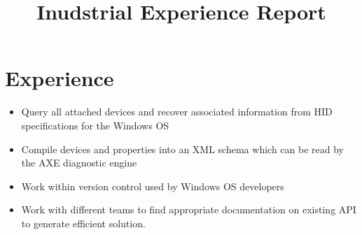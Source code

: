 \documentclass{moderncv}
\title{Inudstrial Experience Report}
\begin{document}
\section{Experience}
\begin{itemize}
 \item Query all attached devices and recover associated information from HID specifications for the Windows OS
 \item Compile devices and properties into an XML schema which can be read by the AXE diagnostic engine
 \item Work within version control used by Windows OS developers
 \item Work with different teams to find appropriate documentation on existing API to generate efficient solution.
\end{itemize}
\end{document}
